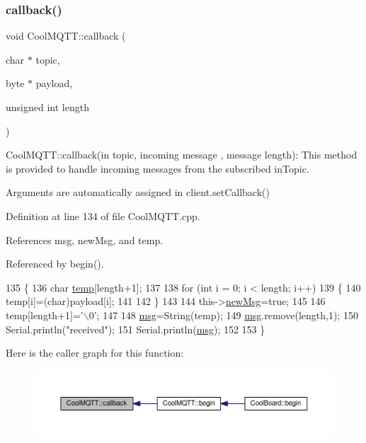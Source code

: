 \mbox{\label{classCoolMQTT_a30d82ad665bfb603f46ecdbc290775df}} 
\subsubsection{\texorpdfstring{callback()}{callback()}}
{\footnotesize\ttfamily void Cool\+M\+Q\+T\+T\+::callback (\begin{DoxyParamCaption}\item[{char $\ast$}]{topic,  }\item[{byte $\ast$}]{payload,  }\item[{unsigned int}]{length }\end{DoxyParamCaption})}

Cool\+M\+Q\+T\+T\+::callback(in topic, incoming message , message length)\+: This method is provided to handle incoming messages from the subscribed in\+Topic.

Arguments are automatically assigned in client.\+set\+Callback() 

Definition at line 134 of file Cool\+M\+Q\+T\+T.\+cpp.



References msg, new\+Msg, and temp.



Referenced by begin().


\begin{DoxyCode}
135 \{
136     \textcolor{keywordtype}{char} \hyperlink{Irene3000_8h_a5905d48604152cf57aa6bfa087b49173}{temp}[length+1];
137 
138     \textcolor{keywordflow}{for} (\textcolor{keywordtype}{int} i = 0; i < length; i++) 
139     \{
140         temp[i]=(char)payload[i]; 
141 
142     \}
143 
144     this->\hyperlink{classCoolMQTT_a3240388137b885775aadf38e96b24c6b}{newMsg}=\textcolor{keyword}{true};
145 
146     temp[length+1]=\textcolor{charliteral}{'\(\backslash\)0'};
147 
148     \hyperlink{classCoolMQTT_af6b19e7074dbbb4ae493c44dcb53f7ff}{msg}=String(temp);
149     \hyperlink{classCoolMQTT_af6b19e7074dbbb4ae493c44dcb53f7ff}{msg}.remove(length,1);
150     Serial.println(\textcolor{stringliteral}{"received"});
151     Serial.println(\hyperlink{classCoolMQTT_af6b19e7074dbbb4ae493c44dcb53f7ff}{msg});
152 
153 \}
\end{DoxyCode}
Here is the caller graph for this function\+:
\nopagebreak
\begin{figure}[H]
\begin{center}
\leavevmode
\includegraphics[width=350pt]{classCoolMQTT_a30d82ad665bfb603f46ecdbc290775df_icgraph}
\end{center}
\end{figure}
\mbox{\label{classCoolMQTT_a0158596b9a2297c8ba609b56ce6bace1}} 
